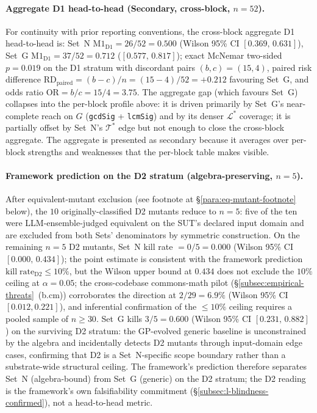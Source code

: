 \documentclass[acmsmall, screen]{acmart}
\begin{document}
\paragraph{Aggregate D1 head-to-head (Secondary, cross-block, $n = 52$).}
For continuity with prior reporting conventions, the cross-block
aggregate D1 head-to-head is: Set~N
$\mathrm{M1}_{\mathrm{D1}} = 26/52 = 0.500$ (Wilson 95\% CI
$[0.369,\,0.631]$), Set~G $\mathrm{M1}_{\mathrm{D1}} = 37/52 =
0.712$ ($[0.577,\,0.817]$); exact McNemar two-sided $p = 0.019$
on the D1 stratum with discordant pairs $(b,c) = (15,4)$, paired
risk difference $\mathrm{RD}_{\mathrm{paired}} = (b - c) / n =
(15 - 4) / 52 = +0.212$ favouring Set~G, and odds ratio
$\mathrm{OR} = b / c = 15 / 4 = 3.75$. The
aggregate gap (which favours Set~G) collapses into the per-block
profile above: it is driven primarily by Set~G's near-complete
reach on $G$ (\texttt{gcdSig} + \texttt{lcmSig}) and by its denser
$\mathcal{L}^{*}$ coverage; it is partially offset by Set~N's
$\mathcal{T}^{*}$ edge but not enough to close the cross-block
aggregate. The aggregate is presented as secondary because it
averages over per-block strengths and weaknesses that the
per-block table makes visible.

\paragraph{Framework prediction on the D2 stratum (algebra-preserving, $n = 5$).}
After equivalent-mutant exclusion (see footnote at
\S\ref{para:eq-mutant-footnote} below), the $10$ originally-classified
D2 mutants reduce to $n = 5$: five of the ten were
LLM-ensemble-judged equivalent on the SUT's declared input domain
and are excluded from both Sets' denominators by symmetric construction.
On the remaining $n = 5$ D2 mutants, Set~N kill rate $= 0/5 = 0.000$
(Wilson 95\% CI $[0.000,\,0.434]$); the point estimate is consistent
with the framework prediction
$\mathrm{kill\;rate}_{\mathrm{D2}} \le 10\%$, but the Wilson upper bound
at $0.434$ does not exclude the $10\%$ ceiling at $\alpha = 0.05$; the
cross-codebase commons-math pilot
(\S\ref{subsec:empirical-threats}~(b.cm))
corroborates the direction at $2/29 = 6.9\%$
(Wilson 95\% CI $[0.012, 0.221]$), and inferential
confirmation of the $\le 10\%$ ceiling requires a pooled sample of
$n \ge 30$. Set~G kills $3/5 = 0.600$
(Wilson 95\% CI $[0.231,\,0.882]$) on the surviving D2 stratum:
the GP-evolved generic baseline is unconstrained by the algebra
and incidentally detects D2 mutants through input-domain edge cases,
confirming that D2 is a Set~N-specific scope boundary rather than a
substrate-wide structural ceiling. The framework's prediction
therefore separates Set~N (algebra-bound) from Set~G (generic) on
the D2 stratum; the D2 reading is the framework's own falsifiability
commitment (\S\ref{subsec:l-blindness-confirmed}), not a head-to-head metric.
\end{document}
